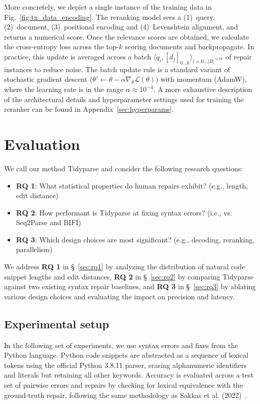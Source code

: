 \documentclass[sigplan,review,acmsmall,nonacm,screen,anonymous]{acmart}\settopmatter{printfolios=false,printccs=false,printacmref=false}
\begin{document}
More concretely, we depict a single instance of the training data in Fig.~\ref{fig:tx_data_encoding}. The reranking model sees a (1)~query, (2)~document, (3)~positional encoding and (4)~Levenshtein alignment, and returns a numerical score. Once the relevance scores are obtained, we calculate the cross-entropy loss across the top-$k$ scoring documents and backpropagate. In practice, this update is averaged across a batch $\langle q_i, [d_j]_{0\ldots k}\rangle_{i=0\ldots |B|^{\approx 16}}$ of repair instances to reduce noise. The batch update rule is a standard variant of stochastic gradient descent $\big(\theta' \leftarrow \theta - \alpha \nabla_{\theta} \mathcal{L}(\theta)\big)$ with momentum (AdamW), where the learning rate is in the range $\alpha\approx10^{-4}$. A more exhaustive description of the architectural details and hyperparameter settings used for training the reranker can be found in Appendix~\ref{sec:hyperparams}.

\clearpage\section{Evaluation}

We call our method Tidyparse and consider the following research questions:

\begin{itemize}
\item \textbf{RQ 1}: What statistical properties do human repairs exhibit? (e.g., length, edit distance)
\item \textbf{RQ 2}: How performant is Tidyparse at fixing syntax errors? (i.e., vs. Seq2Parse and BIFI)
\item \textbf{RQ 3}: Which design choices are most significant? (e.g., decoding, reranking, parallelism)
\end{itemize}

We address \textbf{RQ 1} in \S~\ref{sec:rq1} by analyzing the distribution of natural code snippet lengths and edit distances, \textbf{RQ 2} in \S~\ref{sec:rq2} by comparing Tidyparse against two existing syntax repair baselines, and \textbf{RQ 3} in \S~\ref{sec:rq3} by ablating various design choices and evaluating the impact on precision and latency.

\subsection{Experimental setup}

In the following set of experiments, we use syntax errors and fixes from the Python language. Python code snippets are abstracted as a sequence of lexical tokens using the official Python 3.8.11 parser, erasing alphanumeric identifiers and literals but retaining all other keywords. Accuracy is evaluated across a test set of pairwise errors and repairs by checking for lexical equivalence with the ground-truth repair, following the same methodology as Sakkas et al. (2022)~\cite{sakkas2022seq2parse}.
\end{document}
